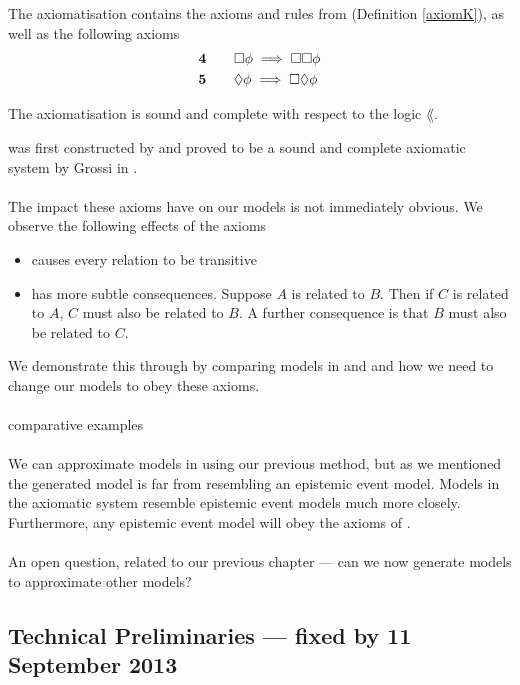 \begin{lemma} \label{axiomK45}
The axiomatisation \AXKFF contains the axioms and rules from \AXK (Definition
    \ref{axiomK}), as well as the following axioms
\begin{alignat*}{2}
  & {\bf 4} && \quad \Box \phi \implies \Box \Box \phi \\
  & {\bf 5} && \quad \Diamond \phi \implies \Box \Diamond \phi
\end{alignat*}
\end{lemma}

\begin{lemma} \label{axiomK45SoundComplete}
The axiomatisation \AXKFF is sound and complete with respect to the logic
$\lang$.
\end{lemma}

\AXKFF was first constructed by \FIXME and proved to be a sound and complete axiomatic
system by Grossi in \cite{grossi2007designing}.\\
\\
The impact these axioms have on our models is not immediately obvious.
We observe the following effects of the axioms
\begin{itemize}
	\item \axFo causes every relation to be transitive
	\item \axFi has more subtle consequences.
    Suppose $A$ is related to $B$.
    Then if $C$ is related to $A$, $C$ must also be related to $B$.
    A further consequence is that $B$ must also be related to $C$.
\end{itemize}

We demonstrate this through by comparing models in \AXK and \AXKFF and how we need to change
our models to obey these axioms.\\
\\
\FIXME comparative examples\\
\\
We can approximate models in \AXKFF using our previous method, but as we mentioned
the generated model is far from resembling an epistemic event model.
Models in the axiomatic system \AXKFF resemble epistemic event models much more closely.
Furthermore, any epistemic event model will obey the axioms of \AXKFF.\\
\\
An open question, related to our previous chapter --- can we now generate \AXKFF models to
approximate other \AXKFF models?

\subsection{Technical Preliminaries --- fixed by 11 September 2013}

